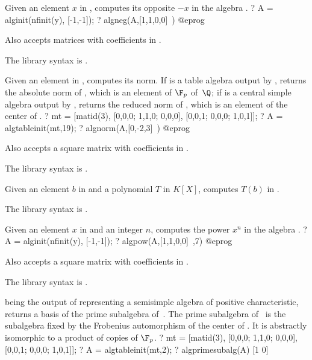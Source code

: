 \label{se:algneg}
Given an element $x$ in , computes its opposite $-x$ in the
algebra .
\bprog
? A = alginit(nfinit(y), [-1,-1]);
? algneg(A,[1,1,0,0]~)
@eprog

Also accepts matrices with coefficients in .

The library syntax is .

\label{se:algnorm}
Given an element  in , computes its norm. If  is
a table algebra output by , returns the absolute norm of
, which is an element of $\F_p$ of~$\Q$; if  is a central
simple algebra output by , returns the reduced norm of ,
which is an element of the center of .
\bprog
? mt = [matid(3), [0,0,0; 1,1,0; 0,0,0], [0,0,1; 0,0,0; 1,0,1]];
? A = algtableinit(mt,19);
? algnorm(A,[0,-2,3]~)
@eprog

Also accepts a square matrix with coefficients in .

The library syntax is .

\label{se:algpoleval}
Given an element $b$ in  and a polynomial $T$ in $K[X]$,
computes $T(b)$ in .

The library syntax is .

\label{se:algpow}
Given an element $x$ in  and an integer $n$, computes the
power $x^n$ in the algebra .
\bprog
? A = alginit(nfinit(y), [-1,-1]);
? algpow(A,[1,1,0,0]~,7)
@eprog

Also accepts a square matrix with coefficients in .

The library syntax is .

\label{se:algprimesubalg}
 being the output of  representing a semisimple
algebra of positive characteristic, returns a basis of the prime subalgebra
of~. The prime subalgebra of~ is the subalgebra fixed by the
Frobenius automorphism of the center of . It is abstractly isomorphic
to a product of copies of $\F_p$.
\bprog
? mt = [matid(3), [0,0,0; 1,1,0; 0,0,0], [0,0,1; 0,0,0; 1,0,1]];
? A = algtableinit(mt,2);
? algprimesubalg(A)
[1 0]

